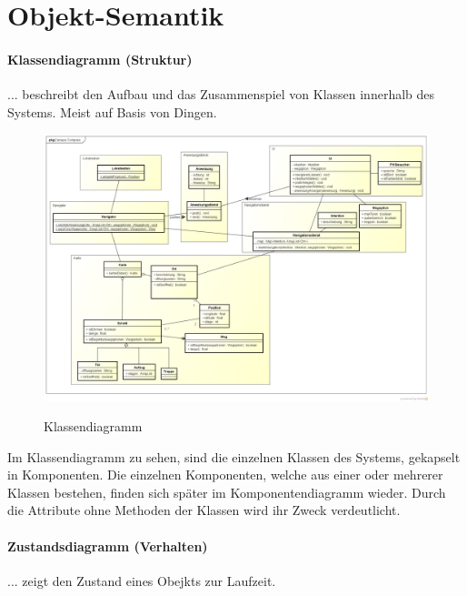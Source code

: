 \chapter{Objekt-Semantik}

\subsubsection*{Klassendiagramm (Struktur)}
... beschreibt den Aufbau und das Zusammenspiel von Klassen innerhalb des Systems. Meist auf Basis von Dingen.

\begin{figure}[hbt]
  \centering
  \includegraphics[width=\linewidth]{img/klassendiagramm.png}
  \label{img:klassendiagramm}
  \caption{Klassendiagramm}
\end{figure}

Im Klassendiagramm zu sehen, sind die einzelnen Klassen des Systems, gekapselt in Komponenten. Die einzelnen Komponenten, welche aus einer oder mehrerer Klassen bestehen, finden sich später im Komponentendiagramm wieder. Durch die Attribute ohne Methoden der Klassen wird ihr Zweck verdeutlicht.

\subsubsection*{Zustandsdiagramm (Verhalten)}
... zeigt den Zustand eines Obejkts zur Laufzeit.

